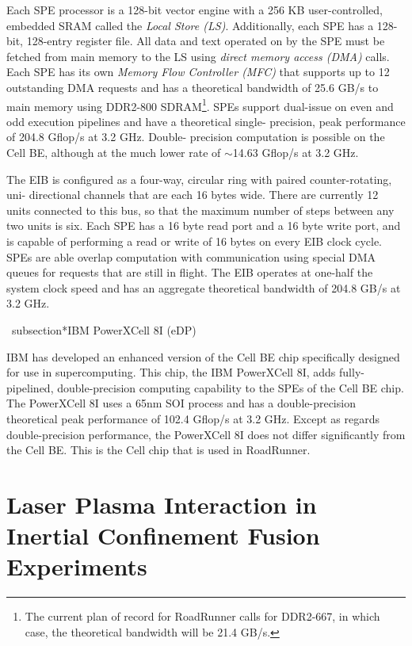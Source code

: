 \documentclass[letter,10pt]{article}
\begin{document}
Each SPE processor is a 128-bit vector engine with a 256 KB 
user-controlled, embedded SRAM called the \emph{Local Store (LS)}.  
Additionally, each SPE has a 128-bit, 128-entry register file.  All 
data and text operated on by the SPE must be fetched from main memory 
to the LS using \emph{direct memory access (DMA)} calls.  Each SPE has 
its own \emph{Memory Flow Controller (MFC)} that supports up to 12 
outstanding DMA requests and has a theoretical bandwidth of 25.6 GB/s 
to main memory using DDR2-800 SDRAM\footnote{The current plan of 
record for RoadRunner calls for DDR2-667, in which case, the 
theoretical bandwidth will be 21.4 GB/s.}.  SPEs support dual-issue on 
even and odd execution pipelines and have a theoretical single-
precision, peak performance of 204.8 Gflop/s at 3.2 GHz.  Double-
precision computation is possible on the Cell BE, although at the much 
lower rate of $\sim$14.63 Gflop/s at 3.2 GHz.

The EIB is configured 
as a four-way, circular ring with paired counter-rotating, uni-
directional channels that are each 16 bytes wide.  There are currently 
12 units connected to this bus, so that the maximum number of steps 
between any two units is six.  Each SPE has a 16 byte read port and a 
16 byte write port, and is capable of performing a read or write of 16 
bytes on every EIB clock cycle.  SPEs are able overlap computation 
with communication using special DMA queues for requests that are 
still in flight.  The EIB operates at one-half the system clock speed 
and has an aggregate theoretical bandwidth of 204.8 GB/s at 3.2 GHz.

\
subsection*{IBM PowerXCell 8I (eDP)}

IBM has developed an enhanced 
version of the Cell BE chip specifically designed for use in 
supercomputing.  This chip, the IBM PowerXCell 8I, adds fully-
pipelined, double-precision computing capability to the SPEs of the 
Cell BE chip.  The PowerXCell 8I uses a 65nm SOI process and has a 
double-precision theoretical peak performance of 102.4 Gflop/s at 3.2 
GHz.  Except as regards double-precision performance, the PowerXCell 
8I does not differ significantly from the Cell BE.  This is the Cell 
chip that is used in RoadRunner.

\section*{Laser Plasma Interaction in Inertial Confinement Fusion Experiments}
\end{document}
